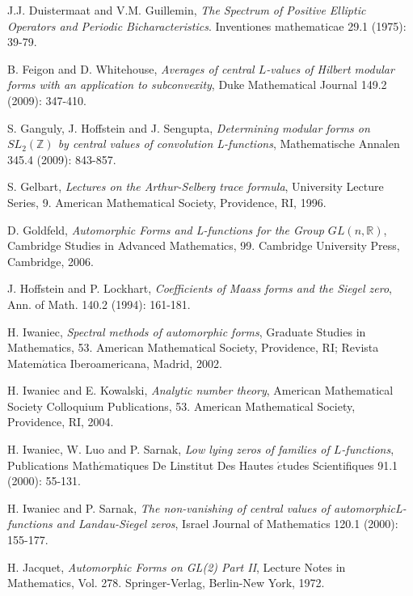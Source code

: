 \documentclass[11pt,reqno]{amsart}
\def\R{\mathbb{R}}
\theoremstyle{definition}
\begin{document}
\begin{thebibliography}{100}
J.J. Duistermaat and V.M. Guillemin,
{\it The Spectrum of Positive Elliptic Operators and Periodic Bicharacteristics}. Inventiones mathematicae 29.1 (1975): 39-79.

B. Feigon and D. Whitehouse,
{\it Averages of central $L$-values of Hilbert modular forms with an application to subconvexity},
Duke Mathematical Journal 149.2 (2009): 347-410.


S. Ganguly, J. Hoffstein and J. Sengupta, {\it Determining modular forms on $SL_2(\mathbb Z)$ by central values of convolution L-functions},
Mathematische Annalen 345.4 (2009): 843-857.


S. Gelbart, {\it Lectures on the Arthur-Selberg trace formula},
University Lecture Series, 9. American Mathematical Society, Providence, RI, 1996.

D. Goldfeld,
{\it Automorphic Forms and L-functions for the Group
$GL(n,\R)$}, Cambridge Studies in Advanced Mathematics, 99. Cambridge University Press, Cambridge, 2006.

J. Hoffstein and P. Lockhart, {\it Coefficients of Maass forms and the Siegel zero}, Ann. of Math. 140.2 (1994): 161-181.

H. Iwaniec,
{\it Spectral methods of automorphic forms},
Graduate Studies in Mathematics, 53. American Mathematical Society, Providence, RI; Revista Matem$\acute{a}$tica Iberoamericana, Madrid, 2002.

H. Iwaniec and E. Kowalski, {\it Analytic number theory},
American Mathematical Society Colloquium Publications, 53.
American Mathematical Society, Providence, RI, 2004.

H. Iwaniec, W. Luo and P. Sarnak,
{\it Low lying zeros of families of $L$-functions},
Publications Math$\acute{e}$matiques De Linstitut Des Hautes $\acute{e}$tudes Scientifiques 91.1 (2000): 55-131.


H. Iwaniec and P. Sarnak, {\it The non-vanishing of central values of automorphicL-functions and Landau-Siegel zeros}, Israel Journal of Mathematics 120.1 (2000): 155-177.


H. Jacquet, {\it Automorphic Forms on GL(2) Part II}, Lecture Notes in Mathematics, Vol. 278. Springer-Verlag, Berlin-New York, 1972.


\end{thebibliography}
\end{document}
